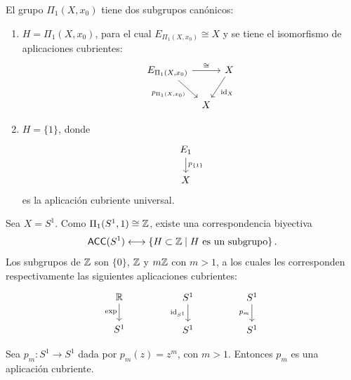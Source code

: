 \begin{nota}
El grupo $\Pi_1(X, x_0)$ tiene dos subgrupos canónicos:
\begin{enumerate}[label=\arabic*)]
    \item $H = \Pi_1(X, x_0)$, para el cual $E_{\Pi_1(X, x_0)} \cong X$ y se tiene el isomorfismo de aplicaciones cubrientes:
    \[
    \begin{tikzcd}[column sep=0.2cm, row sep=normal]
    E_{\Pi_1(X, x_0)} \arrow[rr, "\cong"] \arrow[dr, "p_{\Pi_1(X, x_0)}"'] & & X \arrow[dl, "\id_X"] \\
    & X &
    \end{tikzcd}
    \]
    \item $H = \{1\}$, donde 
    $$\begin{tikzcd}[row sep=0.55cm]
        E_{1}\arrow["p_{\{1\}}",d]\\
        X
    \end{tikzcd}$$ 
    es la aplicación cubriente universal.
\end{enumerate}
\end{nota}

\begin{ejemplo}
Sea $X = S^1$. Como $\Pi_1(S^1, 1) \cong \mathbb{Z}$, existe una correspondencia biyectiva
\[
\textsf{ACC}(S^1) \longleftrightarrow \left\{ H \subset \mathbb{Z} \;\middle|\; H \text{ es un subgrupo} \right\}.
\]
Los subgrupos de $\mathbb{Z}$ son $\{0\}$, $\mathbb{Z}$ y $m\mathbb{Z}$ con $m > 1$, a los cuales les corresponden respectivamente las siguientes aplicaciones cubrientes:
\[
\begin{tikzcd}[row sep=normal]
\R \arrow[d, "\exp"'] \\
S^1
\end{tikzcd}
\qquad\qquad
\begin{tikzcd}[row sep=normal]
S^1 \arrow[d, "\id_{S^1}"'] \\
S^1
\end{tikzcd}
\qquad\qquad
\begin{tikzcd}[row sep=normal]
S^1 \arrow[d, "p_m"'] \\
S^1
\end{tikzcd}
\]
\end{ejemplo}

\begin{lema}
Sea $p_m \colon S^1 \to S^1$ dada por $p_m(z) = z^m$, con $m > 1$. Entonces $p_m$ es una aplicación cubriente.
\end{lema}

